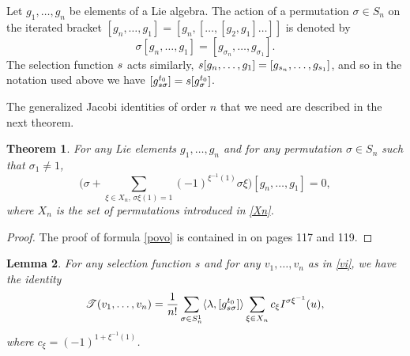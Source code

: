 \documentclass[12pt, reqno]{amsart}
\theoremstyle{plain}
\newtheorem {theorem}{Theorem}[section]
\newtheorem {lemma}[theorem]{Lemma}
\theoremstyle{definition}
\theoremstyle{remark}
\numberwithin{equation}{section}
\newcommand{\T}{\mathcal{T}}
\newcommand{\s}{\sigma}
\newcommand{\0}{\theta}
\newcommand{\1}{{-1}}
\renewcommand{\=}{\coloneqq}
\renewcommand{\.}{\dots}
\begin{document}
Let $g_1,\dots,g_n$ be elements of a Lie algebra. The action of a permutation $\s\in S_n$ on the iterated bracket
$[g_n,\dots,g_1] = [g_n,[\dots,[g_{2}, g_1]\dots]]$ is denoted by
\[
\s [g_n,\dots,g_1] = [g_{\s _n},\dots,g_{\s _1}] .
\]
The selection function $s$ acts similarly, $ s [g_n,\dots,g_1] = [g_{s _n},\dots,g_{s _1}] $, and so in the notation used above we have
$[g^{t_0}_{\j\s } ] = \j [g^{t_0}_{\s } ]$.

The generalized Jacobi identities of order $n$ that we need  are
described in the next theorem.

\begin{theorem}
For any Lie elements $g_1,\dots,g_n$ and for any permutation $\s\in S_n$ such that $\s_1\neq 1$,
\begin{equation} \label{povo}
 \Big(\s+\sum_{\xi\in X_n,\,\s\xi(1)=1}(-1)^{\xi^\1(1)}\s\xi\Big)[g_n,\dots,g_1]=0 ,
\end{equation}
where $X_n$ is the set of permutations introduced in \eqref{Xn}.
\end{theorem}


\begin{proof} The proof of formula \eqref{povo}
is contained in \cite{BL88} on pages 117 and 119.
\end{proof}




\begin{lemma} \label{lisk}
{\color{black} For any selection function $s$ and} for any $v_1,\dots,v_n$ as in \eqref{vi}, we have the identity
\begin{equation}
 \label{mainpolfin}
 \T (v_1,\.,v_n)=\frac{1}{n!}\sum_{\s\in S_n^1 }
 \langle \lambda, [g^{t_0}_{\j\s } ]\rangle \sum_{\xi\in X_n} c_\xi I^{\sigma \xi^\1}(u) ,
\end{equation}
where $c_\xi= (-1)^{1+\xi^\1(1)}$.
\end{lemma}
\end{document}
